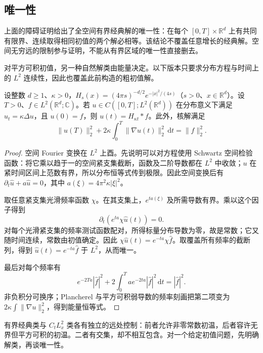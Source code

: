 \subsection{唯一性}
\label{b2:subsec:120303}

上面的障碍证明给出了全空间有界经典解的唯一性：在每个 \([0,T]\times\mathbb R^d\) 上有共同有限界、连续取得相同初值的两个解必相等。该结论不覆盖任意增长的经典解。空间无穷远的限制参与证明，不能从有界区域的唯一性直接删去。

\ProseParagraphBreak

对平方可积初值，另一种自然解类由能量决定。以下版本只要求分布方程与时间上的 \(L^2\) 连续性，因此也覆盖此前构造的粗初值解。

\begin{theorem}[平方可积解的唯一性]\label{b2:thm:12-l2-uniqueness}
设整数 \(d\geq1\)、\(\kappa>0\)，\(H_s(x)=(4\pi s)^{-d/2}e^{-|x|^2/(4s)}\)（\(s>0\)、\(x\in\mathbb R^d\)）。设 \(T>0\)、\(f\in L^2(\mathbb R^d;\mathbb C)\)。若 \(u\in C([0,T];L^2(\mathbb R^d))\) 在分布意义下满足 \(u_t=\kappa\Delta u\)，且 \(u(0)=f\)，则 \(u(t)=H_{\kappa t}*f\)。此外，核解满足
\begin{equation}\label{b2:eq:12-whole-energy}
 \|u(T)\|_2^2+2\kappa\int_0^T\|\nabla u(t)\|_2^2\,\mathrm{d}t
 =\|f\|_2^2.
\end{equation}
\end{theorem}
\begin{proof}
空间 Fourier 变换在 \(L^2\) 上酉。先说明可以对方程使用 Schwartz 空间检验函数：将它乘以趋于一的空间紧支集截断，函数及二阶导数都在 \(L^2\) 中收敛；\(u\) 在紧时间区间上范数有界，所以分布恒等式传到极限。因此空间变换后有 \(\partial_t\widehat u+a\widehat u=0\)，其中 \(a(\xi)=4\pi^2\kappa|\xi|^2\)。

取任意紧支集光滑频率函数 \(\chi\)。在其支集上，\(e^{ta(\xi)}\) 及所需导数有界。乘以这个因子得到
\[
 \partial_t\left(e^{ta}\chi\widehat u(t)\right)=0.
\]
对每个光滑紧支集的频率测试函数配对，所得标量分布导数为零，故是常数；它又随时间连续，常数由初值确定。因此 \(\chi\widehat u(t)=e^{-ta}\chi\widehat f\)。取覆盖所有频率的截断列，得到 \(\widehat u(t)=e^{-ta}\widehat f\) 于 \(L^2\)，从而唯一。

最后对每个频率有
\[
 e^{-2Ta}|\widehat f|^2
 +2\int_0^Tae^{-2ta}|\widehat f|^2\,\mathrm{d}t
 =|\widehat f|^2.
\]
非负积分可换序；Plancherel 与平方可积弱导数的频率刻画把第二项变为 \(2\kappa\int\|\nabla u\|_2^2\)，得到能量恒等式。
\end{proof}

有界经典类与 \(C_tL^2_x\) 类各有独立的远处控制：前者允许非零常数初温，后者容许无界但平方可积的初温。二者有交集，却不相互包含。对一个给定初值问题，先明确解类，再谈唯一性。

